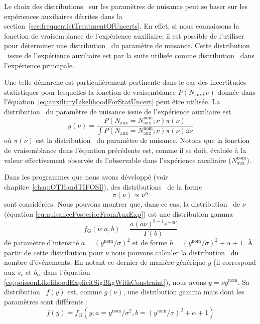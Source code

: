 Le choix des distributions \prior~sur les param\`etres de nuisance peut se baser sur les exp\'eriences auxiliaires d\'ecrites dans la section~\ref{sec:frequentistTreatmentOfUncerts}. En effet, si nous connaissons la fonction de vraisemblance de l'exp\'erience auxiliaire, il est possible de l'utiliser pour d\'eterminer une distribution \posterior~du param\`etre de nuisance. Cette distribution \posterior~issue de l'exp\'erience auxiliaire est par la suite utilis\'ee comme distribution \prior~dans l'exp\'erience principale.

Une telle démarche est particuli\`erement pertinente dans le cas des incertitudes statistiques pour lesquelles la fonction de vraisemblance $P(N_\text{aux};\nu)$ donn\'ee dans l'\'equation~\ref{eq:auxiliaryLikelihoodForStatUncert} peut \^etre utilis\'ee. La distribution \posterior~du param\`etre de nuisance issue de l'exp\'erience auxiliaire est
\begin{equation}
\label{eq:nuisancePosteriorFromAuxExp}
g\left(\nu\right)=\frac{P(N_\text{aux}=N_\text{aux}^{\text{nom}};\nu)\pi\left(\nu\right)}{\displaystyle\int P(N_\text{aux}=N_\text{aux}^{\text{nom}};\nu)\pi\left(\nu\right)\dd\nu}
\end{equation}
o\`u $\pi\left(\nu\right)$ est la distribution \prior~du param\`etre de nuisance. Notons que la fonction de vraisemblance dans l'\'equation pr\'ec\'edente est, comme il se doit, \'evalu\'ee \`a la valeur effectivement observ\'ee de l'observable dans l'exp\'erience auxiliaire ($N_\text{aux}^{\text{nom}}$).

Dans les programmes que nous avons développé (voir chapitre~\ref{chap:OTHandTIFOSI}), des distributions \prior~de la forme 
\[\pi\left(\nu\right)\propto\nu^\alpha\]
sont consid\'er\'ees. Nous pouvons montrer que, dans ce cas, la distribution \posterior~de $\nu$ (\'equation \ref{eq:nuisancePosteriorFromAuxExp}) est une distribution gamma
\begin{equation}
\label{eq:gammaDistribution}
f_\text{G}(\nu;a,b)=\frac{a\left(a\nu\right)^{b-1}e^{-a\nu}}{\Gamma\left(b\right)}
\end{equation}
de param\`etre d'intensit\'e $a=\left(y^{\text{nom}}/\sigma\right)^2$ et de forme $b=\left(y^{\text{nom}}/\sigma\right)^2+\alpha+1$. \`A partir de cette distribution pour $\nu$ nous pouvons calculer la distribution \posterior~du nombre d'\'ev\'enements. En notant ce dernier de mani\`ere g\'en\'erique $y$ (il correspond aux $s_c$ et $b_{ci}$ dans l'\'equation \ref{eq:poissonLikelihoodExplicitSigBkgWithConstraint}), nous avons $y=\nu y^\text{nom}$. Sa distribution \posterior~$f\left(y\right)$ est, comme $g\left(\nu\right)$, une distribution gamma mais dont les param\`etres sont diff\'erents :
\begin{equation}
\label{eq:yieldPosteriorFromAuxExp}
f\left(y\right)=f_\text{G}\left(y;a=y^{\text{nom}}/\sigma^2,b=\left(y^{\text{nom}}/\sigma\right)^2+\alpha+1\right)
\end{equation}

